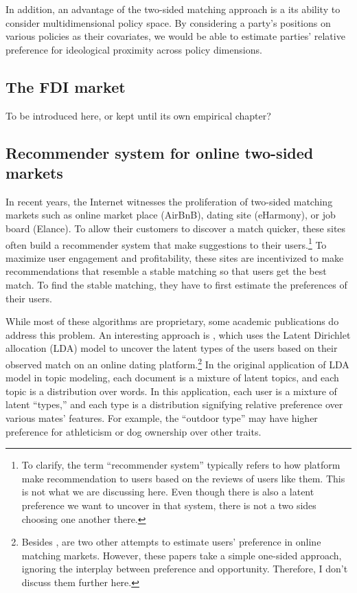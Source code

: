 In addition, an advantage of the two-sided matching approach is a its ability to consider
multidimensional policy space. By considering a party's
positions on various policies as their covariates, we would be able to
estimate parties' relative preference for ideological proximity across policy dimensions.

\subsection{The FDI market}

To be introduced here, or kept until its own empirical chapter?

\subsection{Recommender system for online two-sided markets}

In recent years, the Internet witnesses the proliferation of two-sided
matching markets such as online market place (AirBnB), dating
site (eHarmony), or job board (Elance). To allow their customers to discover a
match quicker, these sites often build a recommender system that make
suggestions to their users.\footnote{To clarify, the term ``recommender system'' typically
  refers to how platform make recommendation to users based on the reviews of
  users like them. This is not what we are discussing here. Even though there is
also a latent preference we want to uncover in that system, there is not a two
sides choosing one another there.} To maximize user engagement and
profitability, these sites are incentivized to
make recommendations that resemble a stable matching so
that users get the best match. To find the stable matching, they have to
first estimate the preferences of their users.

While most of these algorithms are proprietary, some academic
publications do address this problem. An interesting approach is \citet{Tu2014}, which uses the Latent Dirichlet
allocation (LDA) model to uncover the latent
types of the users based on their observed match on an
online dating platform.\footnote{Besides \citet{Tu2014}, \citet{Hitsch2010,
    Goswami2014} are two other attempts to estimate users' preference in online
  matching markets. However, these papers take a simple one-sided approach,
  ignoring the interplay between preference and opportunity. Therefore, I don't
  discuss them further here.} In the original application of LDA model in
topic modeling, each document is a mixture of latent topics, and each
topic is a distribution over words. In this application, each user is a mixture
of latent ``types,'' and each type is a distribution signifying relative
preference over various mates' features. For example, the ``outdoor type'' may have
higher preference for athleticism or dog ownership over other traits.

